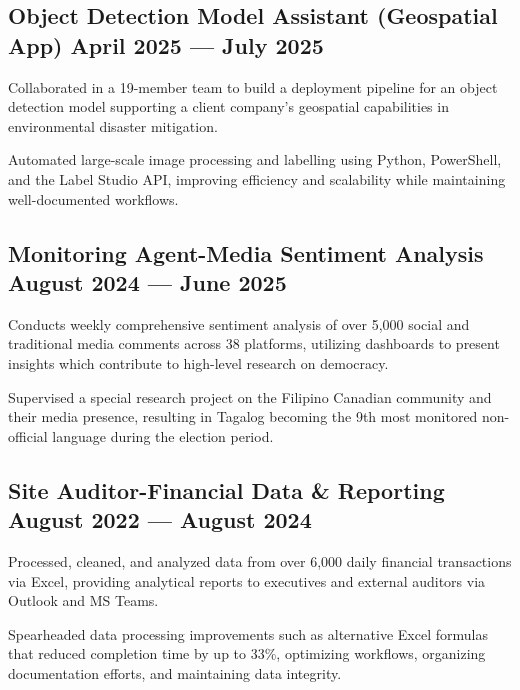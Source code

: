 \subsection{{Object Detection Model Assistant (Geospatial App) \hfill April 2025 --- July 2025}}
\begin{zitemize}
\item Collaborated in a 19-member team to build a deployment pipeline for an object detection model supporting a
client company’s geospatial capabilities in environmental disaster mitigation.
\item Automated large-scale image processing and labelling using Python, PowerShell, and the Label Studio API,
improving efficiency and scalability while maintaining well-documented workflows.
\end{zitemize}

\subsection{{Monitoring Agent-Media Sentiment Analysis \hfill August 2024 --- June 2025}}
\begin{zitemize}
\item Conducts weekly comprehensive sentiment analysis of over 5,000 social and traditional media comments across
38 platforms, utilizing dashboards to present insights which contribute to high-level research on democracy.
\item Supervised a special research project on the Filipino Canadian community and their media presence, resulting
in Tagalog becoming the 9th most monitored non-official language during the election period.
\end{zitemize}

\subsection{{Site Auditor-Financial Data \& Reporting \hfill August 2022 --- August 2024}}
\begin{zitemize}
\item Processed, cleaned, and analyzed data from over 6,000 daily financial transactions via Excel, providing analytical
reports to executives and external auditors via Outlook and MS Teams.
\item Spearheaded data processing improvements such as alternative Excel formulas that reduced completion time by
up to 33\%, optimizing workflows, organizing documentation efforts, and maintaining data integrity.
\end{zitemize}

